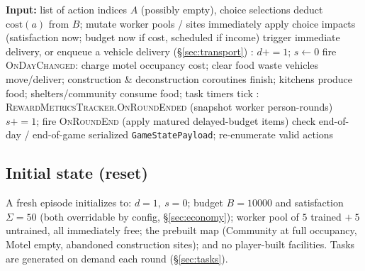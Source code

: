 \documentclass[11pt]{article}
\newcommand{\code}[1]{\texttt{\small #1}}
\newcommand{\Day}{d}
\newcommand{\seg}{s}
\begin{document}
\begin{algorithm}[h]
\caption{Environment step (one round)}
\label{alg:step}
\begin{algorithmic}[1]
\State \textbf{Input:} list of action indices $A$ (possibly empty), choice selections
 
  \State {} 
  \State deduct $\mathrm{cost}(a)$ from $B$; mutate worker pools / sites immediately
\EndFor
{} \Comment{\code{select\_task\_choice}}
  \State apply choice impacts (satisfaction now; budget now if cost, scheduled if income)
  \State trigger immediate delivery, or enqueue a vehicle delivery (\S\ref{sec:transport})
\EndFor
\If{$\seg \geq 4$} 
  \State {} : $\Day \mathbin{+}{=}1$; $\seg \gets 0$
  \State fire \textsc{OnDayChanged}: charge motel occupancy cost; clear food waste
\EndIf
\State {} 
  \Statex \hspace{1.5em} vehicles move/deliver; construction \& deconstruction coroutines finish;
  \Statex \hspace{1.5em} kitchens produce food; shelters/community consume food; task timers tick
\State {} :
  \Statex \hspace{1.5em} \textsc{RewardMetricsTracker.OnRoundEnded} (snapshot worker person-rounds)
  \Statex \hspace{1.5em} $\seg \mathbin{+}{=}1$; fire \textsc{OnRoundEnd} (apply matured delayed-budget items)
  \Statex \hspace{1.5em} check end-of-day / end-of-game
\State \Return serialized \code{GameStatePayload}; re-enumerate valid actions
\end{algorithmic}
\end{algorithm}

\subsection{Initial state (reset)}
A fresh episode initializes to: $\Day=1,\ \seg=0$; budget $B=10000$ and
satisfaction $\Sigma=50$ (both overridable by config, \S\ref{sec:economy});
worker pool of $5$ trained $+\ 5$ untrained, all immediately free; the prebuilt
map (Community at full occupancy, Motel empty, abandoned construction sites);
and no player-built facilities. Tasks are generated on demand each round
(\S\ref{sec:tasks}).
\end{document}

